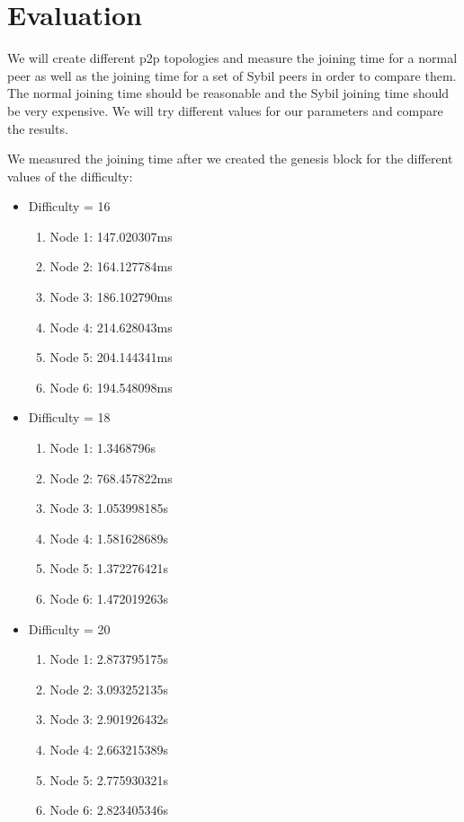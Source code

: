 \documentclass[twocolumn]{article}
\begin{document}
\section{Evaluation}
We will create different p2p topologies and measure the joining time for a normal peer as well as the joining time for a set of Sybil peers in order to compare them. The normal joining time should be reasonable and the Sybil joining time should be very expensive. We will try different values for our parameters and compare the results.


We measured the joining time after we created the genesis block for the different values of the difficulty:
\begin{itemize}
    \item Difficulty = 16
    \begin{enumerate}
        \item Node 1: 147.020307ms
        \item Node 2: 164.127784ms	
        \item Node 3: 186.102790ms	
        \item Node 4: 214.628043ms
        \item Node 5: 204.144341ms
        \item Node 6: 194.548098ms
    \end{enumerate}
    \item Difficulty = 18
        \begin{enumerate}
        \item Node 1: 1.3468796s
        \item Node 2: 768.457822ms	
        \item Node 3: 1.053998185s	
        \item Node 4: 1.581628689s
        \item Node 5: 1.372276421s
        \item Node 6: 1.472019263s
    \end{enumerate}
    \item Difficulty = 20
        \begin{enumerate}
            \item Node 1: 2.873795175s
            \item Node 2: 3.093252135s	
            \item Node 3: 2.901926432s
            \item Node 4: 2.663215389s
            \item Node 5: 2.775930321s
            \item Node 6: 2.823405346s

\end{enumerate}
\end{itemize}
\end{document}
